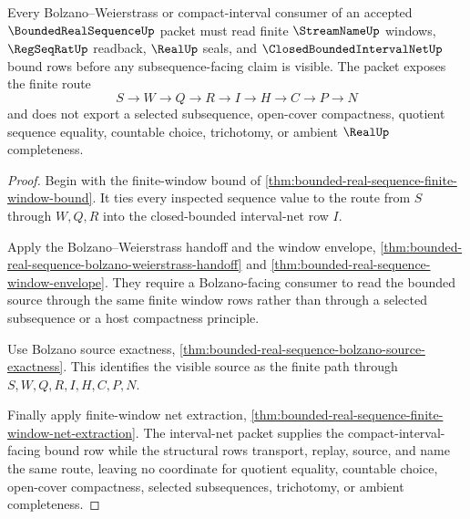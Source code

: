 \begin{theorem}
\label{thm:bounded-real-sequence-compact-interval-subsequence-boundary}
Every Bolzano--Weierstrass or compact-interval consumer of an accepted
$\BoundedRealSequenceUp$ packet must read finite $\StreamNameUp$ windows,
$\RegSeqRatUp$ readback, $\RealUp$ seals, and
$\ClosedBoundedIntervalNetUp$ bound rows before any subsequence-facing claim is
visible. The packet exposes the finite route
$$
S \to W \to Q \to R \to I \to H \to C \to P \to N
$$
and does not export a selected subsequence, open-cover compactness, quotient
sequence equality, countable choice, trichotomy, or ambient $\RealUp$
completeness.
\end{theorem}
\begin{proof}
Begin with the finite-window bound of
\autoref{thm:bounded-real-sequence-finite-window-bound}. It ties every
inspected sequence value to the route from $S$ through $W,Q,R$ into the
closed-bounded interval-net row $I$.

Apply the Bolzano--Weierstrass handoff and the window envelope,
\autoref{thm:bounded-real-sequence-bolzano-weierstrass-handoff} and
\autoref{thm:bounded-real-sequence-window-envelope}. They require a
Bolzano-facing consumer to read the bounded source through the same finite
window rows rather than through a selected subsequence or a host compactness
principle.

Use Bolzano source exactness,
\autoref{thm:bounded-real-sequence-bolzano-source-exactness}. This identifies
the visible source as the finite path through $S,W,Q,R,I,H,C,P,N$.

Finally apply finite-window net extraction,
\autoref{thm:bounded-real-sequence-finite-window-net-extraction}. The
interval-net packet supplies the compact-interval-facing bound row while the
structural rows transport, replay, source, and name the same route, leaving no
coordinate for quotient equality, countable choice, open-cover compactness,
selected subsequences, trichotomy, or ambient completeness.
\end{proof}

